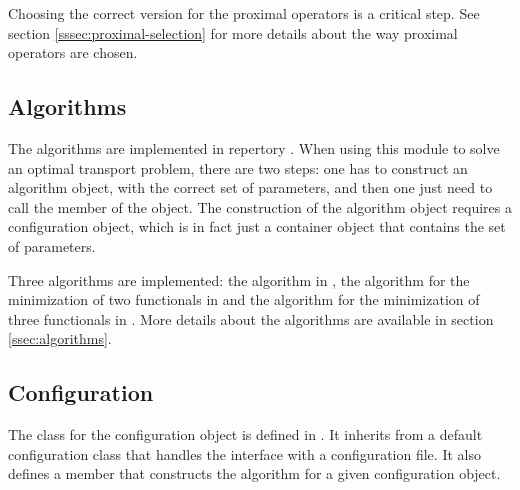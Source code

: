         

        Choosing the correct version for the proximal operators is a critical step. See section \ref{sssec:proximal-selection}
        for more details about the way proximal operators are chosen.

    \subsection{Algorithms}
    \noindent

        The algorithms are implemented in repertory . When using this module to solve an 
        optimal transport problem, there are two steps: one has to construct
        an algorithm object, with the correct set of parameters, and then one just need to call the  member of the object.
        The construction of the algorithm object requires a configuration object, which is in fact just a container object
        that contains the set of parameters.

        Three algorithms are implemented: the \pdAlgo{} algorithm in , the \drAlgo{} algorithm for the minimization of two
        functionals in  and the \drAlgo{} algorithm for the minimization of three functionals in .
        More details about the algorithms are available in section \ref{ssec:algorithms}.

    \subsection{Configuration}
    \noindent

        The class for the configuration object is defined in . It inherits from a default
        configuration class that handles the interface with a configuration file.
        It also defines a member  that constructs the algorithm for a given configuration object.

